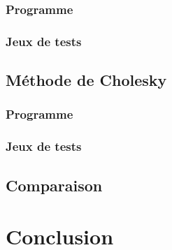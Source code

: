 \documentclass{report}
\begin{document}
      \subsection{Programme}
        
      \subsection{Jeux de tests}
    \newpage
    \section{Méthode de Cholesky}
      \subsection{Programme}
        
      \subsection{Jeux de tests}
      
    \section{Comparaison}
  \chapter*{Conclusion}
\end{document}
